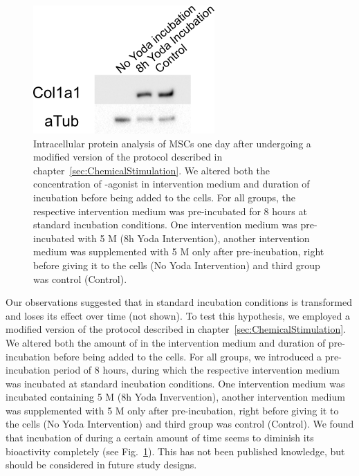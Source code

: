 \begin{figure}
	\centering
	\includegraphics[width = 0.4\linewidth{}]{Inkubationshypothese.png}
	\caption{Intracellular protein analysis of MSCs one day after undergoing a modified version of the protocol described in chapter~\ref{sec:ChemicalStimulation}. We altered both the concentration of \Piezo{}-agonist \Yoda{} in intervention medium and duration of \Yoda{} incubation before being added to the cells. For all groups, the respective intervention medium was pre-incubated for 8 hours at standard incubation conditions. One intervention medium was pre-incubated with 5 \textmu{}M \Yoda{} (8h Yoda Intervention), another intervention medium was supplemented with 5 \textmu{}M \Yoda{} only after pre-incubation, right before giving it to the cells (No Yoda Intervention) and third group was \Yoda{} control (Control).}
	\label{fig:Inkubationshypothese_Western}
\end{figure}

Our observations suggested that in standard incubation conditions \Yoda{} is transformed and loses its effect over time (not shown). To test this hypothesis, we employed a modified version of the protocol described in chapter~\ref{sec:ChemicalStimulation}. We altered both the amount of \Yoda{} in the intervention medium and duration of \Yoda{} pre-incubation before being added to the cells. For all groups, we introduced a pre-incubation period of 8 hours, during which the respective intervention medium was incubated at standard incubation conditions. One intervention medium was incubated containing 5 \textmu{}M \Yoda{} (8h Yoda Invervention), another intervention medium was supplemented with 5 \textmu{}M \Yoda{} only after pre-incubation, right before giving it to the cells (No Yoda Intervention) and third group was \Yoda{} control (Control). We found that incubation of \Yoda{} during a certain amount of time seems to diminish its bioactivity completely (see Fig.~\ref{fig:Inkubationshypothese_Western}). This has not been published knowledge, but should be considered in future study designs.


